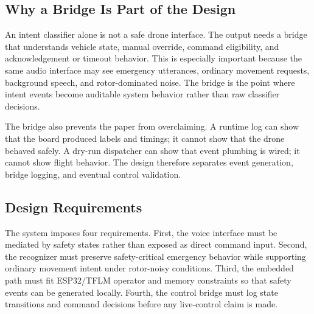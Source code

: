 \subsection{Why a Bridge Is Part of the Design}

An intent classifier alone is not a safe drone interface. The output needs a bridge that understands vehicle state, manual override, command eligibility, and acknowledgement or timeout behavior. This is especially important because the same audio interface may see emergency utterances, ordinary movement requests, background speech, and rotor-dominated noise. The bridge is the point where intent events become auditable system behavior rather than raw classifier decisions.

The bridge also prevents the paper from overclaiming. A runtime log can show that the board produced labels and timings; it cannot show that the drone behaved safely. A dry-run dispatcher can show that event plumbing is wired; it cannot show flight behavior. The design therefore separates event generation, bridge logging, and eventual control validation.

\subsection{Design Requirements}

The system imposes four requirements. First, the voice interface must be mediated by safety states rather than exposed as direct command input. Second, the recognizer must preserve safety-critical emergency behavior while supporting ordinary movement intent under rotor-noisy conditions. Third, the embedded path must fit ESP32/TFLM operator and memory constraints so that safety events can be generated locally. Fourth, the control bridge must log state transitions and command decisions before any live-control claim is made.
